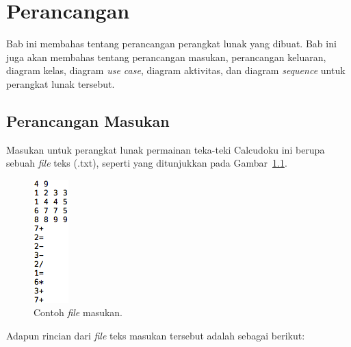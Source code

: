 \chapter{Perancangan}
\label{chap:perancangan}

Bab ini membahas tentang perancangan perangkat lunak yang dibuat. Bab ini juga akan membahas tentang perancangan masukan, perancangan keluaran, diagram kelas, diagram \textit{use case}, diagram aktivitas, dan diagram \textit{sequence} untuk perangkat lunak tersebut.

\section{Perancangan Masukan}
\label{sec:perancanganmasukan}

Masukan untuk perangkat lunak permainan teka-teki Calcudoku ini berupa sebuah \textit{file} teks (.txt), seperti yang ditunjukkan pada Gambar~\ref{fig:perancanganmasukan}.

\begin{figure}
\centering
\captionsetup{justification=centering}
\includegraphics[scale=1]{Gambar/Perancangan/PerancanganInput.png}
\caption[Contoh \textit{file} masukan.]{Contoh \textit{file} masukan.}
\label{fig:perancanganmasukan}
\end{figure}

Adapun rincian dari \textit{file} teks masukan tersebut adalah sebagai berikut:


